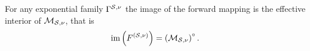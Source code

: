 \begin{theorem}
    \label{the:meanPolytopeInterior}
    For any exponential family $\Gamma^{\mathcal{S},\nu}$ the image of the forward mapping is the effective interior of $\mathcal{M}_{\mathcal{S},\nu}$, that is
    \begin{align*}
        \mathrm{im}\left(F^{(\mathcal{S},\nu)}\right) = {\left(\mathcal{M}_{\mathcal{S},\nu}\right)}^{\circ} \, .
    \end{align*}
\end{theorem}
